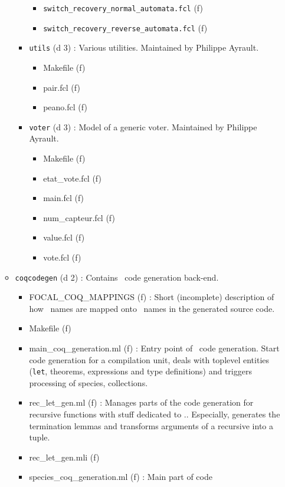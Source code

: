 \begin{itemize}
\begin{itemize}
\begin{itemize}
\begin{itemize}
      \item {\tt switch\_recovery\_normal\_automata.fcl} (f)
      \item {\tt switch\_recovery\_reverse\_automata.fcl} (f)
      \end{itemize}
    \item {\tt utils} (d 3) : Various utilities. Maintained by Philippe
      Ayrault.
      \begin{itemize}
      \item {Makefile} (f)
      \item {pair.fcl} (f)
      \item {peano.fcl} (f)
      \end{itemize}
    \item {\tt voter} (d 3) : Model of a generic voter. Maintained by
      Philippe Ayrault.
      \begin{itemize}
      \item {Makefile} (f)
      \item {etat\_vote.fcl} (f)
      \item {main.fcl} (f)
      \item {num\_capteur.fcl} (f)
      \item {value.fcl} (f)
      \item {vote.fcl} (f)
      \end{itemize}
    \end{itemize}
  \item {\tt coqcodegen} (d 2) : Contains \coq\ code generation back-end.
    \begin{itemize}
    \item {FOCAL\_COQ\_MAPPINGS} (f) : Short (incomplete) description
      of how \focalize\ names are mapped onto \coq\ names in the
      generated source code.
    \item {Makefile} (f)
    \item {main\_coq\_generation.ml} (f) : Entry point of \coq\ code
      generation. Start code generation for a compilation unit, deals
      with toplevel entities ({\tt let}, theorems, expressions and
      type definitions) and triggers processing of species,
      collections.
    \item {rec\_let\_gen.ml} (f) : Manages parts of the code
      generation for recursive functions with stuff dedicated to
      \coq.. Especially, generates the termination lemmas and
      transforms arguments of a recursive into a tuple.
    \item {rec\_let\_gen.mli} (f)
    \item {species\_coq\_generation.ml} (f) : Main part of code

\end{itemize}
\end{itemize}
\end{itemize}
